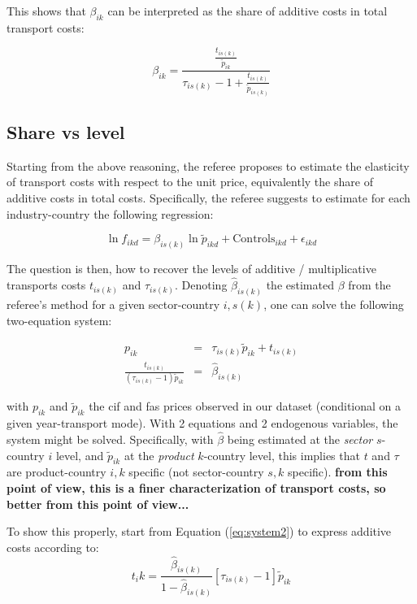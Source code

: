 \documentclass[a4paper,12pt]{article}
\begin{document}
This shows that $\beta_{ik}$ can be interpreted as the share of additive costs in total transport costs:

$$\beta_{ik} = \frac{\frac{t_{is(k)}}{\tilde{p}_{ik}}}{\tau_{is(k)}-1 + \frac{t_{is(k)}}{\tilde{p}_{is(k)}}} $$


\subsection{Share vs level}

Starting from the above reasoning, the referee proposes to estimate the elasticity of transport costs with respect to the unit price, equivalently the share of additive costs in total costs. Specifically, the referee suggests to estimate for each industry-country the following regression:

$$\ln f_{ikd}= \beta_{is(k)} \ln \widetilde{p}_{ikd} + \text{Controls}_{ikd} +\epsilon_{ikd}$$

The question is then, how to recover the levels of additive / multiplicative transports costs $t_{is(k)}$ and $\tau_{is(k)}$. Denoting $\widehat{\beta}_{is(k)}$ the estimated $\beta$ from the referee's method for a given sector-country $i,s(k)$, one can solve the following two-equation system:

\begin{eqnarray}
p_{ik} &=& \tau_{is(k)}\widetilde{p}_{ik} +t_{is(k)} \label{eq:system1}\\
\frac{t_{is(k)}}{(\tau_{is(k)}-1)\widetilde{p}_{ik}} &=& \widehat{\beta}_{is(k)}  \label{eq:system2}
\end{eqnarray}

\noindent with $p_{ik}$ and $\widetilde{p}_{ik}$ the cif and fas prices observed in our dataset (conditional on a given year-transport mode). With 2 equations and 2 endogenous variables, the system might be solved. Specifically, with $\widehat{\beta}$ being estimated at the \textit{sector} $s$- country $i$ level, and $\widetilde{p}_{ik}$ at the \textit{product} $k$-country level, this implies that $t$ and $\tau$ are product-country $i,k$ specific (not sector-country $s,k$ specific). \textbf{from this point of view, this is a finer characterization of transport costs, so better from this point of view...}

To show this properly, start from Equation (\ref{eq:system2}) to express additive costs according to:
$$t_ik = \frac{ \widehat{\beta}_{is(k)}}{1- \widehat{\beta}_{is(k)}} \left[\tau_{is(k)}-1\right]\widetilde{p}_{ik} $$
\end{document}
